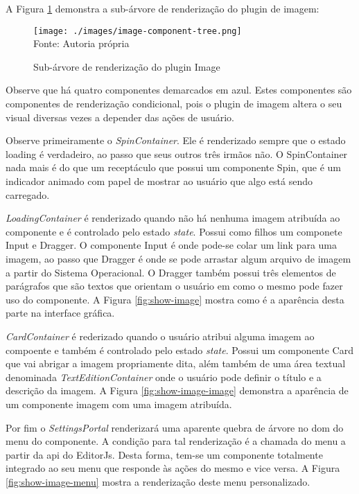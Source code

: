 
A
Figura \ref{fig:image-component-tree}
demonstra a sub-árvore de renderização do plugin de imagem:

\begin{figure}[H]
    \centering
    \caption{Sub-árvore de renderização do plugin Image}
    \texttt{[image: ./images/image-component-tree.png]}
    \label{fig:image-component-tree} \\
    \textnormal{\fontsize{10pt}{12pt}Fonte: Autoria própria}
\end{figure}

Observe que há quatro componentes demarcados em azul. Estes componentes
são componentes de renderização condicional, pois o plugin de imagem
altera o seu visual diversas vezes a depender das ações de usuário.

Observe primeiramente o \textit{SpinContainer}. Ele é renderizado sempre que
o estado loading é verdadeiro, ao passo que seus outros três irmãos não.
O SpinContainer nada mais é do que um receptáculo que possui um componente
Spin, que é um indicador animado com papel de mostrar ao usuário que algo está
sendo carregado.

\textit{LoadingContainer} é renderizado quando não há nenhuma imagem atribuída ao componente
e é controlado pelo estado \textit{state}. Possui como filhos um componete Input e Dragger.
O componente Input é onde pode-se colar um link para uma imagem, ao passo que Dragger é
onde se pode arrastar algum arquivo de imagem a partir do Sistema Operacional. O Dragger
também possui três elementos de parágrafos que são textos que orientam o usuário em como
o mesmo pode fazer uso do componente. A
Figura \ref{fig:show-image}
mostra como é a aparência desta parte na interface gráfica.

\textit{CardContainer} é rederizado quando o usuário atribui alguma imagem ao compoente e também
é controlado pelo estado \textit{state}.
Possui um componente Card que vai abrigar a imagem propriamente dita, além também de uma área
textual denominada \textit{TextEditionContainer} onde o usuário pode definir o título e a descrição
da imagem. A
Figura \ref{fig:show-image-image}
demonstra a aparência de um componente imagem com uma imagem atribuída.

Por fim o \textit{SettingsPortal} renderizará uma aparente quebra de árvore no
\acrshort{dom}
do menu do componente. A condição para tal renderização é a chamada do menu
a partir da
\acrshort{api}
do EditorJs. Desta forma, tem-se um componente totalmente integrado ao seu
menu que responde às ações do mesmo e vice versa.
A
Figura \ref{fig:show-image-menu}
mostra a renderização deste menu personalizado.

